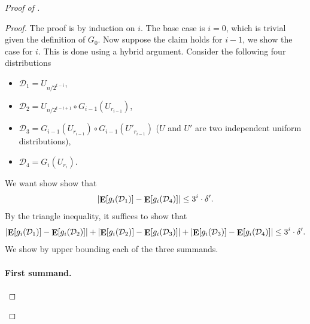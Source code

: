 \documentclass[10pt,a4paper]{article}
\DeclareMathOperator*\Exp{{\bf E}}
\begin{document}
\begin{proof}[Proof of ]
	    \begin{proof}\renewcommand{\qedsymbol}{$\square$ (\Cref{lem:prg-lc-claim-1})}
	    	The proof is by induction on $i$. The base case is $i=0$, which is trivial given the definition of $G_{0}$. Now suppose the claim holds for $i-1$, we show the case for $i$. This is done using a hybrid argument. Consider the following four distributions
	    	\begin{itemize}
	    		\item $\mathcal{D}_1=U_{n/2^{t-i}}$,
	    		\item $\mathcal{D}_2=U_{n/2^{t-i+1}}\circ G_{i-1}(U_{r_{i-1}})$,
	    		\item $\mathcal{D}_3=G_{i-1}(U_{r_{i-1}}) \circ G_{i-1}(U'_{r_{i-1}})$ ($U$ and $U'$ are two independent uniform distributions),
	    		\item $\mathcal{D}_4=G_i(U_{r_i})$.
	    	\end{itemize}
	    	We want show show that
	    	\[
	    		\left|\Exp[g_i(\mathcal{D}_1)]-\Exp[g_i(\mathcal{D}_4)]\right|\leq 3^{i}\cdot \delta'.
	    	\]
	    	By the triangle inequality, it suffices to show that
	    	\begin{equation}\label{eq:prg-lc-triangle}
	    		\left|\Exp[g_i(\mathcal{D}_1)]-\Exp[g_i(\mathcal{D}_2)]\right| + \left|\Exp[g_i(\mathcal{D}_2)]-\Exp[g_i(\mathcal{D}_3)]\right| + \left|\Exp[g_i(\mathcal{D}_3)]-\Exp[g_i(\mathcal{D}_4)]\right| \leq  3^{i}\cdot \delta'.
	    	\end{equation}
	    	We show  by upper bounding each of the three summands.
	    	
	    	\paragraph{First summand.}
	    	

\end{proof}
\end{proof}
\end{document}
